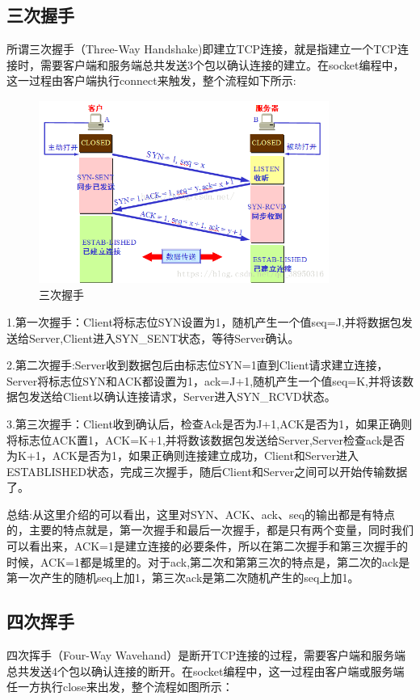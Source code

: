 \documentclass[UTF8]{ctexart}
\begin{document}
\subsection{三次握手}

所谓三次握手（Three-Way Handshake)即建立TCP连接，就是指建立一个TCP连接时，需要客户端和服务端总共发送3个包以确认连接的建立。在socket编程中，这一过程由客户端执行connect来触发，整个流程如下所示:
\begin{figure}[htbp]
\centering
\includegraphics[height=6.0cm,width=9.5cm]{Figure/Three.png}
\caption{三次握手}
\end{figure}

1.第一次握手：Client将标志位SYN设置为1，随机产生一个值seq=J,并将数据包发送给Server,Client进入SYN\_SENT状态，等待Server确认。

2.第二次握手:Server收到数据包后由标志位SYN=1直到Client请求建立连接，Server将标志位SYN和ACK都设置为1，ack=J+1,随机产生一个值seq=K,并将该数据包发送给Client以确认连接请求，Server进入SYN\_RCVD状态。

3.第三次握手：Client收到确认后，检查Ack是否为J+1,ACK是否为1，如果正确则将标志位ACK置1，ACK=K+1,并将数该数据包发送给Server,Server检查ack是否为K+1，ACK是否为1，如果正确则连接建立成功，Client和Server进入ESTABLISHED状态，完成三次握手，随后Client和Server之间可以开始传输数据了。

总结:从这里介绍的可以看出，这里对SYN、ACK、ack、seq的输出都是有特点的，主要的特点就是，第一次握手和最后一次握手，都是只有两个变量，同时我们可以看出来，ACK=1是建立连接的必要条件，所以在第二次握手和第三次握手的时候，ACK=1都是城里的。对于ack,第二次和第第三次的特点是，第二次的ack是第一次产生的随机seq上加1，第三次ack是第二次随机产生的seq上加1。

\subsection{四次挥手}

四次挥手（Four-Way Wavehand）是断开TCP连接的过程，需要客户端和服务端总共发送4个包以确认连接的断开。在socket编程中，这一过程由客户端或服务端任一方执行close来出发，整个流程如图所示：
\end{document}
